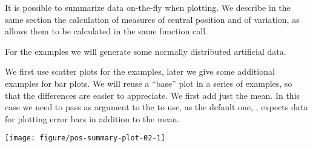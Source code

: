 \documentclass[krantz2]{krantz}\usepackage{knitr}%
\begin{document}
It is possible to summarize data on-the-fly when plotting. We describe in the same section the calculation of measures of central position and of variation, as  allows them to be calculated in the same function call.

For the examples we will generate some normally distributed artificial data.

\begin{knitrout}\footnotesize
{}\color{fgcolor}\begin{kframe}
\begin{alltt}
 \hlkwb{<-} \hlstd{(}
   \hlstd{=} \hlstd{(}\hlstd{(}\hlstd{,}  \hlstd{=} \hlstd{,}  \hlstd{=} \hlstd{),}
        \hlstd{(}\hlstd{,}  \hlstd{=} \hlstd{,}  \hlstd{=} \hlstd{)),}
   \hlstd{=} \hlstd{(}\hlstd{(}\hlstd{(}\hlstd{,} \hlstd{),} \hlstd{(}\hlstd{,} \hlstd{)))}
  \hlstd{)}
\end{alltt}
\end{kframe}
\end{knitrout}

We first use scatter plots for the examples, later we give some additional examples for bar plots.
We will reuse a ``base'' plot in a series of examples, so that the differences are easier to appreciate. We first add just the mean. In this case we need to pass as argument to  the  to use, as the default one, , expects data for plotting error bars in addition to the mean.

\begin{knitrout}\footnotesize
{}\color{fgcolor}\begin{kframe}
\begin{alltt}
\hlstd{(}  \hlstd{(}    \hlopt{+}
  \hlstd{(} \hlstd{=} \hlstd{)} \hlopt{+}
  \hlstd{(} \hlstd{=} \hlstd{,}  \hlstd{=} \hlstd{,}  \hlstd{=} \hlstd{,}  \hlstd{=} \hlstd{,}  \hlstd{=} \hlstd{)}
\end{alltt}
\end{kframe}

{\centering \texttt{[image: figure/pos-summary-plot-02-1]} 

}



\end{knitrout}
\end{document}
